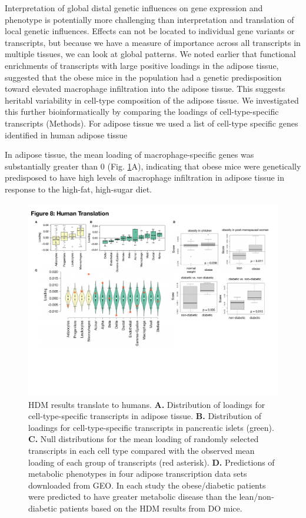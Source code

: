 \documentclass[
]{article}
\begin{document}
Interpretation of global distal genetic influences on gene expression
and phenotype is potentially more challenging than interpretation and
translation of local genetic influences. Effects can not be located to
individual gene variants or transcripts, but because we have a measure
of importance across all transcripts in multiple tissues, we can look at
global patterns. We noted earlier that functional enrichments of
transcripts with large positive loadings in the adipose tissue,
suggested that the obese mice in the population had a genetic
predisposition toward elevated macrophage infiltration into the adipose
tissue. This suggests heritabl variability in cell-type composition of
the adipose tissue. We investigated this further bioinformatically by
comparing the loadings of cell-type-specific transcripts (Methods). For
adipose tissue we used a list of cell-type specific genes identified in
human adipose tissue

In adipose tissue, the mean loading of macrophage-specific genes was
substantially greater than 0 (Fig. \ref{fig:human_translation}A),
indicating that obese mice were genetically predisposed to have high
levels of macrophage infiltration in adipose tissue in response to the
high-fat, high-sugar diet.

\begin{figure}[ht!]
\includegraphics[width=\textwidth]{Figures/Fig8_Human_Translation.pdf} 
\caption{HDM results translate to humans. \textbf{A.} Distribution of 
loadings for cell-type-specific transcripts in adipose tissue. \textbf{B.} 
Distribution of loadings for cell-type-specific transcripts in pancreatic 
islets (green). \textbf{C.} Null distributions for the mean loading of 
randomly selected transcripts in each cell type compared with the observed 
mean loading of each group of transcripts (red asterisk). \textbf{D.} 
Predictions of metabolic phenotypes in four adipose transcription data 
sets downloaded from GEO. In each study the obese/diabetic patients were 
predicted to have greater metabolic disease than the lean/non-diabetic 
patients based on the HDM results from DO mice.
}
\label{fig:human_translation}
\end{figure}
\end{document}
